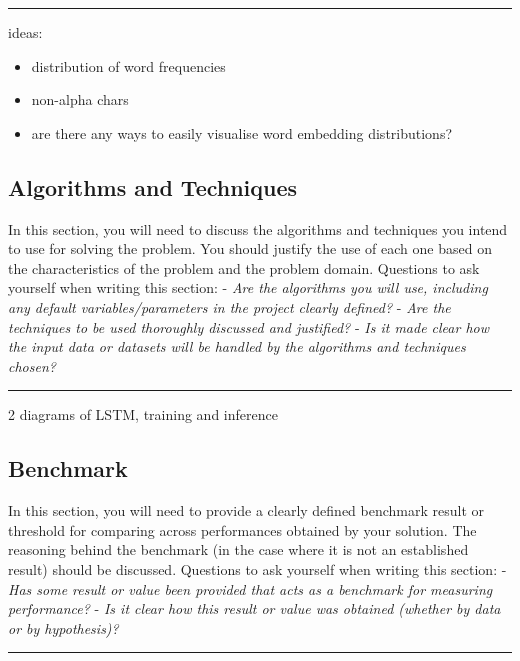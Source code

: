 \documentclass[12pt]{article}
\begin{document}
\begin{center}\rule{0.5\linewidth}{\linethickness}\end{center}

ideas:

\begin{itemize}
\item
  distribution of word frequencies
\item
  non-alpha chars
\item
  are there any ways to easily visualise word embedding distributions?
\end{itemize}

\subsection{Algorithms and Techniques}\label{algorithms-and-techniques}

In this section, you will need to discuss the algorithms and techniques
you intend to use for solving the problem. You should justify the use of
each one based on the characteristics of the problem and the problem
domain. Questions to ask yourself when writing this section: - \emph{Are
the algorithms you will use, including any default variables/parameters
in the project clearly defined?} - \emph{Are the techniques to be used
thoroughly discussed and justified?} - \emph{Is it made clear how the
input data or datasets will be handled by the algorithms and techniques
chosen?}

\begin{center}\rule{0.5\linewidth}{\linethickness}\end{center}

2 diagrams of LSTM, training and inference

\subsection{Benchmark}\label{benchmark}

In this section, you will need to provide a clearly defined benchmark
result or threshold for comparing across performances obtained by your
solution. The reasoning behind the benchmark (in the case where it is
not an established result) should be discussed. Questions to ask
yourself when writing this section: - \emph{Has some result or value
been provided that acts as a benchmark for measuring performance?} -
\emph{Is it clear how this result or value was obtained (whether by data
or by hypothesis)?}

\begin{center}\rule{0.5\linewidth}{\linethickness}\end{center}
\end{document}
